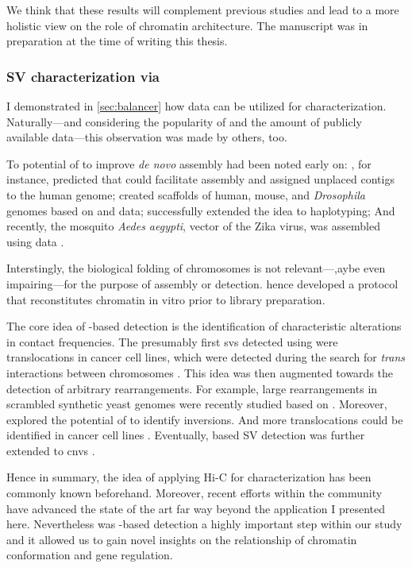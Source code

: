We think that these results will complement
previous studies and lead to a more holistic view on the role of chromatin
architecture. The manuscript was in preparation at the time of writing this
thesis.





\subsubsection{SV characterization via \hic}
I demonstrated in \cref{sec:balancer} how \hic data can be utilized for \sv
characterization. Naturally---and considering the popularity of \hic and the
amount of publicly available data---this observation was made by others, too.

To potential of \hic to improve \textit{de novo} assembly had been noted early on:
, for instance, predicted that \hic could facilitate assembly
and assigned unplaced contigs to the human genome;  created
scaffolds of human, mouse, and \textit{Drosophila} genomes based on \hic and
\mps data;  successfully extended the idea to haplotyping;
And recently, the mosquito \textit{Aedes aegypti}, vector of the Zika virus, was
assembled using \hic data \citep{Dudchenko2017}.

Interstingly, the biological folding of chromosomes is not relevant---,aybe even
impairing---for the purpose of assembly or \sv detection. \citet{Putnam2016}
hence developed a protocol that reconstitutes chromatin in vitro prior to \hic
library preparation.

The core idea of \hic-based \sv detection is the identification of characteristic
alterations in contact frequencies. The presumably first \acp{sv} detected using
\hic were translocations in cancer cell lines, which were detected during the
search for \textit{trans} interactions between chromosomes \citep{Rickman2012}.
This idea was then augmented towards the detection of arbitrary rearrangements.
For example, large rearrangements in scrambled synthetic yeast genomes were
recently studied based on \hic \citep{Mercy2017}. Moreover, \citet{Putnam2016}
explored the potential of \hic to identify inversions. And more translocations
could be identified in cancer cell lines \citep{Barutcu2015,Ay2015,Harewood2017}.
Eventually, \hic based SV detection was further extended to \acp{cnv}
\citep{Harewood2017,Li2018}.

Hence in summary, the idea of applying Hi-C for \sv characterization has been
commonly known beforehand. Moreover, recent efforts within the community
have advanced the state of the art far way beyond the application I presented
here.  Nevertheless was \hic-based \sv detection a highly important step within
our study and it allowed us to gain novel insights on the relationship of
chromatin conformation and gene regulation.




